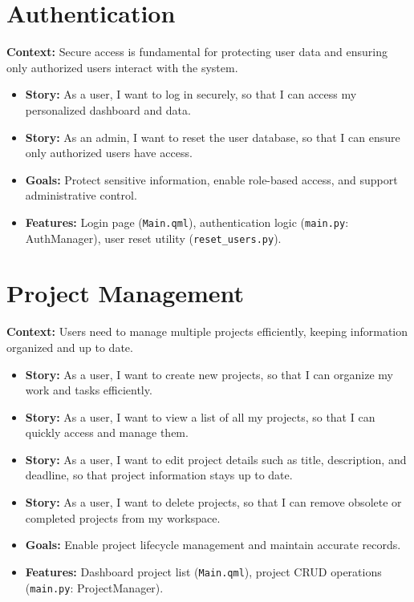\documentclass{report}
\begin{document}
\section{Authentication}
\textbf{Context:} Secure access is fundamental for protecting user data and ensuring only authorized users interact with the system.
\begin{itemize}
    \item \textbf{Story:} As a user, I want to log in securely, so that I can access my personalized dashboard and data.
    \item \textbf{Story:} As an admin, I want to reset the user database, so that I can ensure only authorized users have access.
    \item \textbf{Goals:} Protect sensitive information, enable role-based access, and support administrative control.
    \item \textbf{Features:} Login page (\texttt{Main.qml}), authentication logic (\texttt{main.py}: AuthManager), user reset utility (\texttt{reset\_users.py}).
\end{itemize}

\section{Project Management}
\textbf{Context:} Users need to manage multiple projects efficiently, keeping information organized and up to date.
\begin{itemize}
    \item \textbf{Story:} As a user, I want to create new projects, so that I can organize my work and tasks efficiently.
    \item \textbf{Story:} As a user, I want to view a list of all my projects, so that I can quickly access and manage them.
    \item \textbf{Story:} As a user, I want to edit project details such as title, description, and deadline, so that project information stays up to date.
    \item \textbf{Story:} As a user, I want to delete projects, so that I can remove obsolete or completed projects from my workspace.
    \item \textbf{Goals:} Enable project lifecycle management and maintain accurate records.
    \item \textbf{Features:} Dashboard project list (\texttt{Main.qml}), project CRUD operations (\texttt{main.py}: ProjectManager).
\end{itemize}
\end{document}
